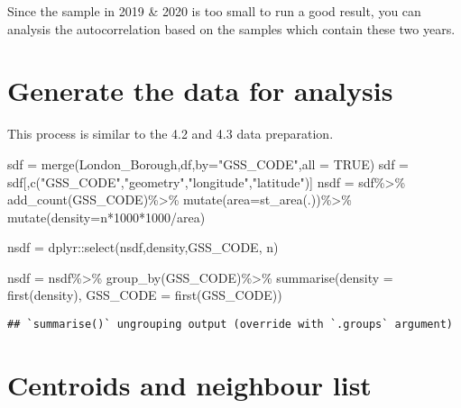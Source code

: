 \documentclass[
]{book}
\newenvironment{Shaded}{\begin{snugshade}}{\end{snugshade}}
\newcommand{\AttributeTok}[1]{\textcolor[rgb]{0.77,0.63,0.00}{#1}}
\newcommand{\ConstantTok}[1]{\textcolor[rgb]{0.00,0.00,0.00}{#1}}
\newcommand{\DecValTok}[1]{\textcolor[rgb]{0.00,0.00,0.81}{#1}}
\newcommand{\FunctionTok}[1]{\textcolor[rgb]{0.00,0.00,0.00}{#1}}
\newcommand{\NormalTok}[1]{#1}
\newcommand{\OtherTok}[1]{\textcolor[rgb]{0.56,0.35,0.01}{#1}}
\newcommand{\SpecialCharTok}[1]{\textcolor[rgb]{0.00,0.00,0.00}{#1}}
\newcommand{\StringTok}[1]{\textcolor[rgb]{0.31,0.60,0.02}{#1}}
\begin{document}
Since the sample in 2019 \& 2020 is too small to run a good result, you can analysis the autocorrelation based on the samples which contain these two years.

\hypertarget{generate-the-data-for-analysis}{%
\section{Generate the data for analysis}\label{generate-the-data-for-analysis}}

This process is similar to the 4.2 and 4.3 data preparation.

\begin{Shaded}
\begin{Highlighting}[]
\NormalTok{sdf }\OtherTok{=} \FunctionTok{merge}\NormalTok{(London\_Borough,df,}\AttributeTok{by=}\StringTok{"GSS\_CODE"}\NormalTok{,}\AttributeTok{all =} \ConstantTok{TRUE}\NormalTok{)}
\NormalTok{sdf }\OtherTok{=}\NormalTok{ sdf[,}\FunctionTok{c}\NormalTok{(}\StringTok{"GSS\_CODE"}\NormalTok{,}\StringTok{"geometry"}\NormalTok{,}\StringTok{"longitude"}\NormalTok{,}\StringTok{"latitude"}\NormalTok{)]}
\NormalTok{nsdf }\OtherTok{=}\NormalTok{ sdf}\SpecialCharTok{\%\textgreater{}\%}
  \FunctionTok{add\_count}\NormalTok{(GSS\_CODE)}\SpecialCharTok{\%\textgreater{}\%}
  \FunctionTok{mutate}\NormalTok{(}\AttributeTok{area=}\FunctionTok{st\_area}\NormalTok{(.))}\SpecialCharTok{\%\textgreater{}\%}
  \FunctionTok{mutate}\NormalTok{(}\AttributeTok{density=}\NormalTok{n}\SpecialCharTok{*}\DecValTok{1000}\SpecialCharTok{*}\DecValTok{1000}\SpecialCharTok{/}\NormalTok{area)}

\NormalTok{nsdf }\OtherTok{=}\NormalTok{ dplyr}\SpecialCharTok{::}\FunctionTok{select}\NormalTok{(nsdf,density,GSS\_CODE, n)}

\NormalTok{nsdf }\OtherTok{=}\NormalTok{ nsdf}\SpecialCharTok{\%\textgreater{}\%}                    
  \FunctionTok{group\_by}\NormalTok{(GSS\_CODE)}\SpecialCharTok{\%\textgreater{}\%}         
  \FunctionTok{summarise}\NormalTok{(}\AttributeTok{density =} \FunctionTok{first}\NormalTok{(density), }\AttributeTok{GSS\_CODE =} \FunctionTok{first}\NormalTok{(GSS\_CODE))}
\end{Highlighting}
\end{Shaded}

\begin{verbatim}
## `summarise()` ungrouping output (override with `.groups` argument)
\end{verbatim}

\hypertarget{centroids-and-neighbour-list}{%
\section{Centroids and neighbour list}\label{centroids-and-neighbour-list}}
\end{document}
